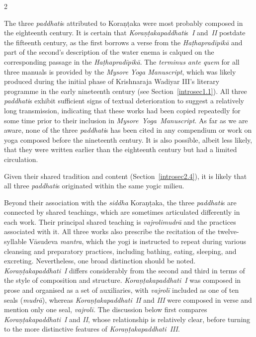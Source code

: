 \begin{nohyp}
\begin{multicols*}{2}
\begin{eng}
The three \emph{paddhati}s attributed to Koraṇṭaka were most probably composed in the eighteenth century. It is certain that \emph{Koraṇṭakapaddhati}s~\emph{I} and~\emph{II} postdate the fifteenth century, as the first borrows a verse from the \emph{Haṭhapradīpikā} and part of the second's description of the water enema is calqued on the corresponding passage in the \emph{Haṭhapradīpikā}. The \emph{terminus ante quem} for all three manuals is provided by the \emph{Mysore Yoga Manuscript}, which was likely produced during the initial phase of Krishnaraja Wadiyar III's literary programme in the early nineteenth century (see Section~\ref{introsec1.1}). All three \emph{paddhati}s exhibit sufficient signs of textual deterioration to suggest a relatively long transmission, indicating that these works had been copied repeatedly for some time prior to their inclusion in \emph{Mysore~Yoga~Manuscript}. As far as we are aware, none of the three \emph{paddhati}s has been cited in any compendium or work on yoga composed before the nineteenth century. It is also possible, albeit less likely, that they were written earlier than the eighteenth century but had a limited circulation.

Given their shared tradition and content (Section~\ref{introsec2.4}), it is likely that all three \emph{paddhati}s originated within the same yogic milieu.
\vskip 18pt

\label{introsec2.4}
\vskip 9pt

\noindent
Beyond their association with the \emph{siddha} Koraṇṭaka, the three \emph{paddhati}s are connected by shared teachings, which are sometimes articulated differently in each work. Their principal shared teaching is \emph{vajrolimudrā} and the practices associated with it. All three works also prescribe the recitation of the twelve-syllable Vāsudeva \emph{mantra}, which the yogi is instructed to repeat during various cleansing and preparatory practices, including bathing, eating, sleeping, and excreting. Nevertheless, one broad distinction should be noted. \emph{Koraṇṭakapaddhati}~\emph{I} differs considerably from the second and third in terms of the style of composition and structure. \emph{Koraṇṭakapaddhati}~\emph{I} was composed in prose and organised as a set of auxiliaries, with \emph{vajrolī} included as one of ten seals (\emph{mudrā}), whereas \emph{Koraṇṭakapaddhati}~\emph{II} and \emph{III} were composed in verse and mention only one seal, \emph{vajrolī.} The discussion below first compares \emph{Koraṇṭakapaddhati}~\emph{I} and \emph{II}, whose relationship is relatively clear, before turning to the more distinctive features of \emph{Koraṇṭakapaddhati~III}.
\columnbreak


\end{eng}
\end{multicols*}
\end{nohyp}
